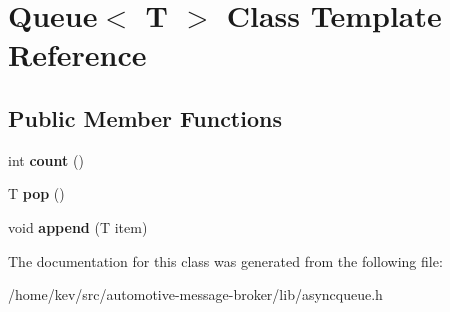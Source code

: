 \hypertarget{classQueue}{\section{Queue$<$ T $>$ Class Template Reference}
\label{classQueue}
}
\subsection*{Public Member Functions}
\begin{DoxyCompactItemize}
\item 
\hypertarget{classQueue_ad2779bcb60e23b597662c393bf04271c}{int {\bfseries count} ()}\label{classQueue_ad2779bcb60e23b597662c393bf04271c}

\item 
\hypertarget{classQueue_abeee018138cbb5226e5352a5788e23bd}{T {\bfseries pop} ()}\label{classQueue_abeee018138cbb5226e5352a5788e23bd}

\item 
\hypertarget{classQueue_aac05de7be433aa524a9a93e5a894aaa5}{void {\bfseries append} (T item)}\label{classQueue_aac05de7be433aa524a9a93e5a894aaa5}

\end{DoxyCompactItemize}


The documentation for this class was generated from the following file\+:\begin{DoxyCompactItemize}
\item 
/home/kev/src/automotive-\/message-\/broker/lib/asyncqueue.\+h\end{DoxyCompactItemize}
